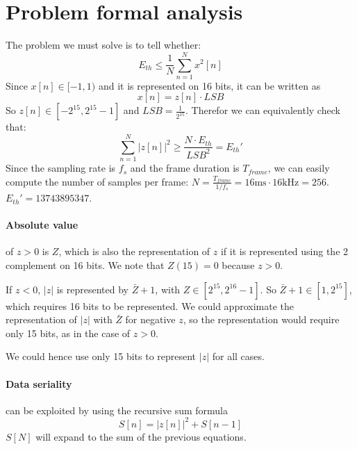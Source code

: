 \section{Problem formal analysis}
The problem we must solve is to tell whether:
\begin{equation*}
  E_{th} \le \frac{1}{N} \sum_{n=1}^N x^2[n]
\end{equation*}
Since $ x[n] \in [-1, 1) $ and it is represented on 16 bits, it can be
written as
\begin{equation*}
  x[n] = z[n]\cdot LSB
\end{equation*}
So $z[n] \in [-2^{15}, 2^{15} - 1]$ and $LSB = \frac{1}{2^{15}}$. Therefor we
can equivalently check that:
\begin{equation*}
  \sum_{n=1}^N |z[n]|^2 \ge \frac{N \cdot E_{th}}{LSB^2} = E_{th}'
\end{equation*}
Since the sampling rate is $f_s$ and the frame duration is $T_{frame}$,
we can easily compute the number of samples per frame:
$N = \frac{T_{frame}}{1/f_s} = 16\si{\milli\second} \cdot 16\si{\kilo\hertz} = 256$.
$E_{th}' = 13743895347$.

\paragraph{Absolute value} of $z > 0$ is $Z$, which is also the representation
of $z$ if it is represented using the 2 complement on 16 bits. We note that
$Z(15) = 0$ because $z > 0$.

If $z < 0$, $|z|$ is represented by $\bar{Z} + 1$, with $Z\in[2^{15}, 2^{16}-1]$.
So $\bar{Z} + 1 \in [1, 2^{15}]$, which requires 16 bits to be represented.
We could approximate the representation of $|z|$ with $\bar{Z}$ for negative $z$,
so the representation would require only 15 bits, as in the case of $z > 0$.

We could hence use only 15 bits to represent $|z|$ for all cases.

\paragraph{Data seriality} can be exploited by using the recursive sum formula
\begin{equation*}
  S[n] = |z[n]|^2 + S[n - 1]
\end{equation*}
$S[N]$ will expand to the sum of the previous equations.
